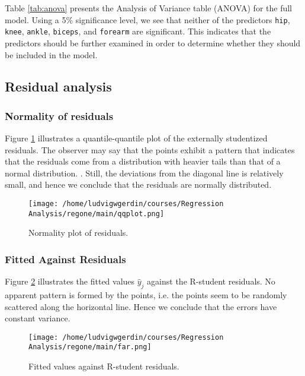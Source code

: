 \documentclass[11pt]{article}
\begin{document}
Table \ref{tab:anova} presents the Analysis of Variance table (ANOVA) for the full model. Using a
5\% significance level, we see that neither of the predictors \texttt{hip}, \texttt{knee}, \texttt{ankle},
\texttt{biceps}, and \texttt{forearm} are significant. This indicates that the predictors should be 
further examined in order to determine whether they should be included in the model. 





\subsection{Residual analysis}
\label{sec:org4b9ff00}
\subsubsection{Normality of residuals}
\label{sec:orgccfa5e1}

Figure \ref{fig:orgc8a18fa} illustrates a quantile-quantile plot of the externally studentized residuals.
The observer may say that the  points exhibit a pattern that indicates that the residuals come from
a distribution with heavier tails than that of a normal distribution. 
\cite{Montgomery2012}. Still, the deviations from the diagonal line is relatively small, and hence
we conclude that the residuals are normally distributed.

\begin{figure}[htbp]
\centering
\texttt{[image: /home/ludvigwgerdin/courses/Regression Analysis/regone/main/qqplot.png]}
\caption{\label{fig:orgc8a18fa}
Normality plot of residuals.}
\end{figure}

\subsubsection{Fitted Against Residuals}
\label{sec:org6a3ac9c}

Figure \ref{fig:org1926155} illustrates the fitted values \(\hat y_j\) against the R-student residuals. No apparent 
pattern is formed by the points, i.e. the points seem to be randomly scattered along the horizontal line.
Hence we conclude that the errors have constant variance.

\begin{figure}[htbp]
\centering
\texttt{[image: /home/ludvigwgerdin/courses/Regression Analysis/regone/main/far.png]}
\caption{\label{fig:org1926155}
Fitted values against R-student residuals.}
\end{figure}
\end{document}
